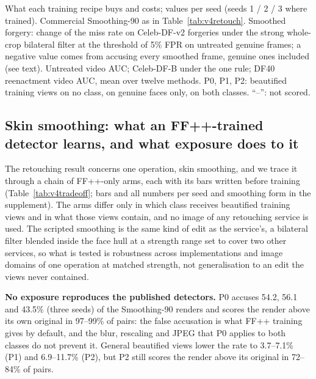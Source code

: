 \documentclass[conference]{IEEEtran}
\begin{document}
\begin{table}[t]
\centering
\caption{What each training recipe buys and costs; values per seed (seeds 1 / 2 / 3 where trained). Commercial
Smoothing-90 as in Table~\ref{tab:v4retouch}. Smoothed forgery: change of the miss rate on Celeb-DF-v2 forgeries under
the strong whole-crop bilateral filter at the threshold of 5\% FPR on untreated genuine frames; a negative value comes
from accusing every smoothed frame, genuine ones included (see text). Untreated video AUC; Celeb-DF-B under the one rule;
DF40 reenactment video AUC, mean over twelve methods. P0, P1, P2: beautified training views on no class, on genuine
faces only, on both classes. ``--'': not scored.}
\label{tab:v4tradeoff}
\scriptsize
\begin{adjustbox}{max width=\textwidth}\end{adjustbox}
\end{table}

\subsection{Skin smoothing: what an FF++-trained detector learns, and what exposure does to it}
\label{sec:mechanism2}
The retouching result concerns one operation, skin smoothing, and we trace it through a chain of FF++-only arms, each
with its bars written before training (Table~\ref{tab:v4tradeoff}; bars and all numbers per seed and smoothing form in
the supplement). The arms differ only in which class receives beautified training views and in what those views
contain, and no image of any retouching service is used. The scripted smoothing is the same kind of edit as the
service's, a bilateral filter blended inside the face hull at a strength range set to cover two other services, so what
is tested is robustness across implementations and image domains of one operation at matched strength, not
generalisation to an edit the views never contained.

\textbf{No exposure reproduces the published detectors.} P0 accuses 54.2, 56.1 and 43.5\% (three seeds) of the
Smoothing-90 renders and scores the render above its own original in 97--99\% of pairs: the false accusation is what
FF++ training gives by default, and the blur, rescaling and JPEG that P0 applies to both classes do not prevent it.
General beautified views lower the rate to 3.7--7.1\% (P1) and 6.9--11.7\% (P2), but P2 still scores the render above
its original in 72--84\% of pairs.
\end{document}
